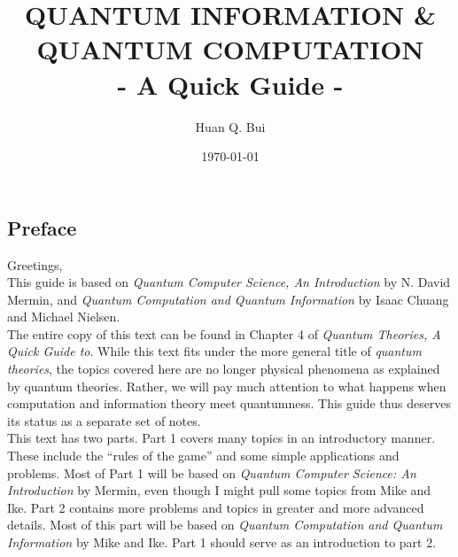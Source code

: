 \documentclass{book}
\theoremstyle{definition}
\begin{document}
\begin{titlepage}\centering
 \clearpage
 \title{{\textsc{\textbf{QUANTUM INFORMATION \& QUANTUM COMPUTATION}}}\\ \smallskip - A Quick Guide - \\}
 \author{\bigskip Huan Q. Bui}
 \date{\today}
 \maketitle
 \thispagestyle{empty}
\end{titlepage}

\subsection*{Preface}

Greetings,\\

This guide is based on \textit{Quantum Computer Science, An Introduction} by N. David Mermin, and \textit{Quantum Computation and Quantum Information} by Isaac Chuang and Michael Nielsen. \\

The entire copy of this text can be found in Chapter 4 of \textit{Quantum Theories, A Quick Guide to}. While this text fits under the more general title of \textit{quantum theories}, the topics covered here are no longer physical phenomena as explained by quantum theories. Rather, we will pay much attention to what happens when computation and information theory meet quantumness. This guide thus deserves its status as a separate set of notes.\\

This text has two parts. Part 1 covers many topics in an introductory manner. These include the ``rules of the game'' and some simple applications and problems. Most of Part 1 will be based on \textit{Quantum Computer Science: An Introduction} by Mermin, even though I might pull some topics from Mike and Ike. Part 2 contains more problems and topics in greater and more advanced details. Most of this part will be based on \textit{Quantum Computation and Quantum Information} by Mike and Ike. Part 1 should serve as an introduction to part 2. \\
\end{document}
